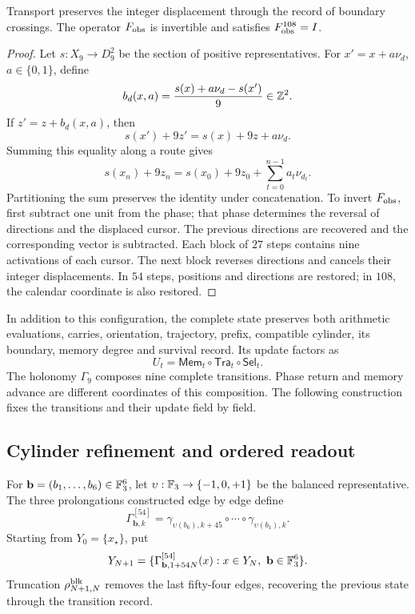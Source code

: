 \begin{proposition}
\label{hmtfg:transporte-calendario}
Transport preserves the integer displacement through the record of boundary crossings. The operator \(F_{\rm obs}\) is invertible and satisfies
\(F_{\rm obs}^{108}=I\).
\end{proposition}
\begin{proof}
Let \(s:X_9\to D_9^2\) be the section of positive representatives. For
\(x'=x+a\nu_d\), \(a\in\{0,1\}\), define
\[
 b_d(x,a)=\frac{s(x)+a\nu_d-s(x')}{9}\in\mathbb Z^2.
\]
If \(z'=z+b_d(x,a)\), then
\[
 s(x')+9z'=s(x)+9z+a\nu_d.
\]
Summing this equality along a route gives
\[
 s(x_n)+9z_n=s(x_0)+9z_0+\sum_{t=0}^{n-1}a_t\nu_{d_t}.
\]
Partitioning the sum preserves the identity under concatenation. To invert \(F_{\rm obs}\), first subtract one unit from the phase; that phase determines the reversal of directions and the displaced cursor. The previous directions are recovered and the corresponding vector is subtracted. Each block of \(27\) steps contains nine activations of each cursor. The next block reverses directions and cancels their integer displacements. In \(54\) steps, positions and directions are restored; in \(108\), the calendar coordinate is also restored.
\end{proof}

In addition to this configuration, the complete state preserves both arithmetic evaluations, carries, orientation, trajectory, prefix, compatible cylinder, its boundary, memory degree and survival record. Its update factors as
\[
 U_t=\mathsf{Mem}_t\circ\mathsf{Tra}_t\circ\mathsf{Sel}_t.
\]
The holonomy \(\Gamma_9\) composes nine complete transitions. Phase return and memory advance are different coordinates of this composition. The following construction fixes the transitions and their update field by field.



\subsection{Cylinder refinement and ordered readout}
\label{hmtfg:refinamiento-ordenado}

For \(\mathbf b=(b_1,\ldots,b_6)\in\mathbb F_3^6\), let
\(\upsilon:\mathbb F_3\to\{-1,0,+1\}\) be the balanced representative. The three prolongations constructed edge by edge define
\[
 \Gamma^{[54]}_{\mathbf b,k}
 =\gamma_{\upsilon(b_6),k+45}\circ\cdots\circ
   \gamma_{\upsilon(b_1),k}.
\]
Starting from \(Y_0=\{x_\star\}\), put
\[
 Y_{N+1}
 =\{\Gamma^{[54]}_{\mathbf b,1+54N}(x):
          x\in Y_N,\ \mathbf b\in\mathbb F_3^6\}.
\]
Truncation \(\rho^{\rm blk}_{N+1,N}\) removes the last fifty-four edges, recovering the previous state through the transition record.

